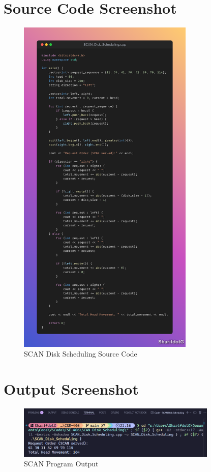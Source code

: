 \documentclass[12pt,a4paper]{article}
\begin{document}
\section{Source Code Screenshot}
\begin{figure}[H]
  \centering
  \includegraphics[width=0.75\textwidth]{Code.png}
  \caption{SCAN Disk Scheduling Source Code}
\end{figure}

\section{Output Screenshot}
\begin{figure}[H]
  \centering
  \includegraphics[width=0.85\textwidth]{Screenshot 2025-08-21 211712.png}
  \caption{SCAN Program Output}
\end{figure}
\end{document}
